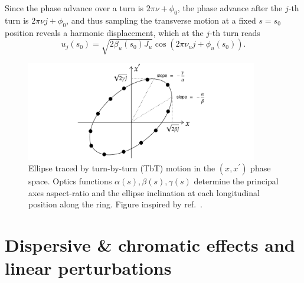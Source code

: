  Since the phase advance over a turn is $2\pi \nu+\phi_0$, the phase advance after the $j$-th turn is $2\pi\nu j+\phi_0$, and thus
 sampling the transverse motion at a fixed $s=s_0$ position reveals a harmonic displacement, which at the $j$-th turn reads
\begin{equation}
    u_j(s_0)=\sqrt{2\beta_u(s_0) J_u}\cos(2\pi\nu_u j+\phi_u(s_0)).
    \label{eq:TbT_motion}
\end{equation}
\begin{figure}[htb]
    \centering
    \includegraphics[width=0.9\textwidth]{Images/ellipse.pdf}
    \caption[Ellipse traced by turn-by-turn (TbT) motion in the $(x,x^\prime)$ phase space.]{Ellipse traced by turn-by-turn (TbT) motion in the $(x,x^\prime)$ phase space. Optics functions $\alpha(s), \beta(s), \gamma(s)$ determine the principal axes aspect-ratio and the ellipse inclination at each longitudinal position along the ring. Figure inspired by ref.~\cite{wolski_beam_2014}.}
    \label{ellipse}
\end{figure}
\section{Dispersive \& chromatic effects and linear perturbations}
